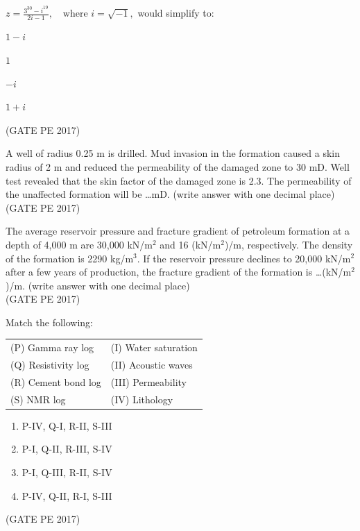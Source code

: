 \documentclass[journal,12pt,onecolumn]{IEEEtran}
\theoremstyle{remark}
\begin{document}
\begin{enumerate}
{\item $z = \frac{3^{30} - i^{19}}{2i - 1}, \quad \text{where } i = \sqrt{-1},$ would simplify to:
\begin{enumerate}
\begin{multicols}{4}
\item $1 - i$
\item $1$
\item $-i$
\item $1 + i$
\end{multicols}
\end{enumerate}
\hfill{(GATE PE 2017)}

\item A well of radius 0.25 m is drilled. Mud invasion in the formation caused a skin radius of 2 m and reduced the permeability of the damaged zone to 30 mD. Well test revealed that the skin factor of the damaged zone is 2.3.
The permeability of the unaffected formation will be \dots mD. (write answer with one decimal place)\\

\hfill{(GATE PE 2017)}

\item The average reservoir pressure and fracture gradient of petroleum formation at a depth of 4,000 m are 30,000 kN/m$^2$ and 16 (kN/m$^2$)/m, respectively.
The density of the formation is 2290 kg/m$^3$. If the reservoir pressure declines to 20,000 kN/m$^2$ after a few years of production, the fracture gradient of the formation is \dots(kN/m$^2$)/m. (write answer with one decimal place)\\

\hfill{(GATE PE 2017)}

\item Match the following:\\

\begin{tabular}{ll}
(P) Gamma ray log & (I) Water saturation \\
(Q) Resistivity log & (II) Acoustic waves \\
(R) Cement bond log & (III) Permeability \\
(S) NMR log & (IV) Lithology \\
\end{tabular}
\begin{enumerate}
\item P-IV, Q-I, R-II, S-III \\
\item P-I, Q-II, R-III, S-IV \\
\item P-I, Q-III, R-II, S-IV \\
\item P-IV, Q-II, R-I, S-III
\end{enumerate}
\hfill{(GATE PE 2017)}

}
\end{enumerate}
\end{document}
